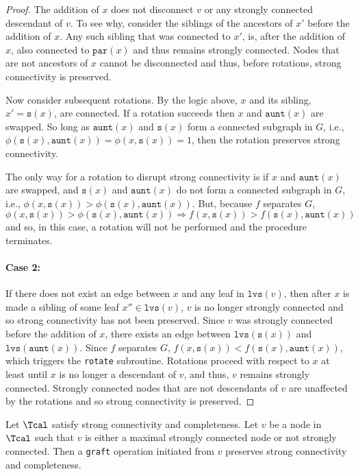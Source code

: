 \documentclass{article} \usepackage[utf8]{inputenc} \usepackage[T1]{fontenc}    \usepackage{hyperref}       \usepackage{url}            \usepackage{booktabs}       \usepackage{amsfonts}       \usepackage{nicefrac}       \usepackage{microtype}      \usepackage{geometry}
\newcommand{\graft}{\texttt{graft}\xspace}
\newcommand{\rotate}{\texttt{rotate}\xspace}
\newcommand{\lvs}[1]{\ensuremath{\texttt{lvs}(#1)}}
\newcommand{\sib}[1]{\ensuremath{\texttt{s}}(#1)\xspace}
\newcommand{\parent}[1]{\ensuremath{\texttt{par}}(#1)\xspace}
\newcommand{\aunt}[1]{\ensuremath{\texttt{aunt}}(#1)\xspace}
\begin{document}
\begin{appendix}
\begin{proof}
The addition of $x$ does not disconnect $v$ or any strongly connected
descendant of $v$. To see why, consider the siblings of the ancestors
of $x'$ before the addition of $x$. Any such sibling that was
connected to $x'$, is, after the addition of $x$, also connected to
$\parent{x}$ and thus remains strongly connected. Nodes that are not
ancestors of $x$ cannot be disconnected and thus, before rotations,
strong connectivity is preserved.

Now consider subsequent rotations. By the logic above, $x$ and its
sibling, $x' = \sib{x}$, are connected. If a rotation succeeds then $x$ and
$\aunt{x}$ are swapped. So long as $\aunt{x}$ and $\sib{x}$ form a
connected subgraph in $G$, i.e., $\phi(\sib{x}, \aunt{x}) = \phi(x,
\sib{x}) = 1$, then the rotation preserves strong connectivity.

The only way for a rotation to disrupt strong connectivity is if $x$
and $\aunt{x}$ are swapped, and $\sib{x}$ and $\aunt{x}$ do not form a
connected subgraph in $G$, i.e., $\phi(x, \sib{x}) > \phi(\sib{x},
\aunt{x})$. But, because $f$ separates $G$, $\phi(x, \sib{x}) >
\phi(\sib{x}, \aunt{x}) \Longrightarrow f(x, \sib{x}) > f(\sib{x},
\aunt{x})$ and so, in this case, a rotation will not be performed and
the procedure terminates.

\paragraph{Case 2:}
If there does not exist an edge between $x$ and any leaf in $\lvs{v}$,
then after $x$ is made a sibling of some leaf $x'' \in \lvs{v}$, $v$
is no longer strongly connected and so strong connectivity has not
been preserved. Since $v$ was strongly connected before the addition
of $x$, there exists an edge between $\lvs{\sib{x}}$ and
$\lvs{\aunt{x}}$.  Since $f$ separates $G$, $f(x, \sib{x}) <
f(\sib{x}, \aunt{x})$, which triggers the \rotate
subroutine. Rotations proceed with respect to $x$ at least until $x$
is no longer a descendant of $v$, and thus, $v$ remains strongly
connected. Strongly connected nodes that are not descendants of $v$
are unaffected by the rotations and so strong connectivity is
preserved.
\end{proof}

\begin{lemma}
\label{thm:grafting1}
Let $\Tcal$ satisfy strong connectivity and completeness. Let $v$ be a
node in $\Tcal$ such that $v$ is either a maximal strongly connected
node or not strongly connected. Then a \graft operation initiated from
$v$ preserves strong connectivity and completeness.
\end{lemma}


\end{appendix}
\end{document}
